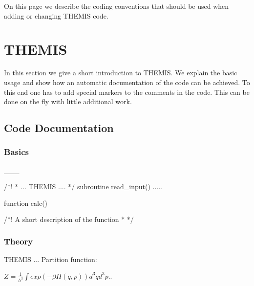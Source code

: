 On this page we describe the coding conventions that should be used when adding or changing T\+H\+E\+M\+IS code.\hypertarget{conv_themis}{}\section{T\+H\+E\+M\+IS}\label{conv_themis}
In this section we give a short introduction to T\+H\+E\+M\+IS. We explain the basic usage and show how an automatic documentation of the code can be achieved. To this end one has to add special markers to the comments in the code. This can be done on the fly with little additional work.\hypertarget{conv_code}{}\subsection{Code Documentation}\label{conv_code}
\hypertarget{conv_basic}{}\subsubsection{Basics}\label{conv_basic}
\+\_\+\+\_\+\+\_\+ \begin{DoxyVerb}/*!
 * ... THEMIS  ....
 */ 
subroutine read_input()
{ ..... }
\end{DoxyVerb}


\begin{DoxyVerb} function calc()
\end{DoxyVerb}


\begin{DoxyVerb}/*! \brief A short description of the function 
 *
 */ 
\end{DoxyVerb}
\hypertarget{conv_theory}{}\subsubsection{Theory}\label{conv_theory}




T\+H\+E\+M\+IS ... Partition function\+:~

$ Z = \frac{1}{h^{3}}\int exp(-\beta H(q,p))d^{3}qd^{3}p $.. 